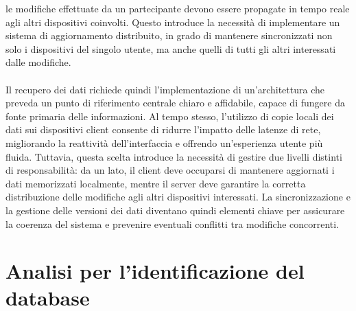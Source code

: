 le modifiche effettuate da un partecipante devono essere propagate
in tempo reale agli altri dispositivi coinvolti.
Questo introduce la necessità di implementare un sistema di aggiornamento distribuito,
in grado di mantenere sincronizzati non solo i dispositivi del singolo utente,
ma anche quelli di tutti gli altri interessati dalle modifiche.\\
\\
Il recupero dei dati richiede quindi l'implementazione di un'architettura che preveda
un punto di riferimento centrale chiaro e affidabile,
capace di fungere da fonte primaria delle informazioni.
Al tempo stesso, l'utilizzo di copie locali dei dati sui dispositivi client
consente di ridurre l'impatto delle latenze di rete,
migliorando la reattività dell'interfaccia e offrendo un'esperienza utente più fluida.
Tuttavia, questa scelta introduce la necessità di gestire due livelli distinti di responsabilità:
da un lato, il client deve occuparsi di mantenere aggiornati i dati memorizzati localmente,
mentre il server deve garantire la corretta distribuzione
delle modifiche agli altri dispositivi interessati.
La sincronizzazione e la gestione delle versioni dei dati diventano quindi
elementi chiave per assicurare la coerenza del sistema e
prevenire eventuali conflitti tra modifiche concorrenti.

\clearpage
\section{Analisi per l'identificazione del database}

